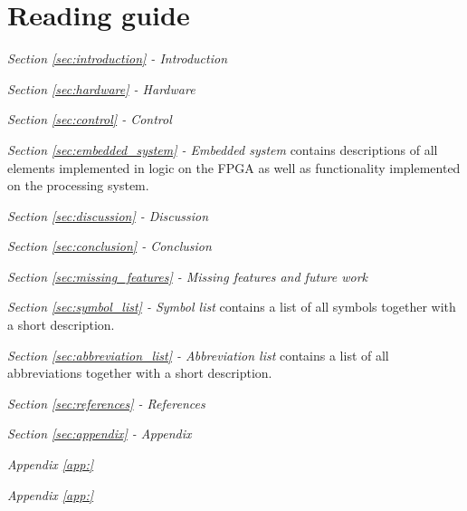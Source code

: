 \section{Reading guide}






\emph{Section \ref{sec:introduction} - Introduction}  

\medskip
\emph{Section \ref{sec:hardware} - Hardware} 

\medskip
\emph{Section \ref{sec:control} - Control} 

\medskip
\emph{Section \ref{sec:embedded_system} - Embedded system} contains descriptions of all elements implemented in logic on the FPGA as well as functionality implemented on the processing system. 

\medskip
\emph{Section \ref{sec:discussion} - Discussion} 

\medskip
\emph{Section \ref{sec:conclusion} - Conclusion} 

\medskip
\emph{Section \ref{sec:missing_features} - Missing features and future work} 

\medskip
\emph{Section \ref{sec:symbol_list} - Symbol list} contains a list of all symbols together with a short description.

\medskip
\emph{Section \ref{sec:abbreviation_list} - Abbreviation list} contains a list of all abbreviations together with a short description.

\medskip
\emph{Section \ref{sec:references} - References} 


\medskip
\emph{Section \ref{sec:appendix} - Appendix} 

\quad \textit{Appendix \ref{app:}} 

\quad \textit{Appendix \ref{app:}} 
